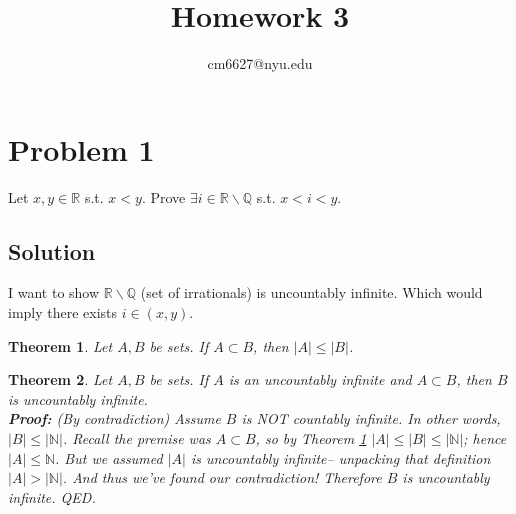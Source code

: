 \documentclass[12pt,fleqn]{article}
\title{Homework 3}
\author{cm6627@nyu.edu}
\date{}
\numberwithin{equation}{section} %
\newtheorem{theorem}{Theorem}
\begin{document}
\maketitle
\section*{Problem 1}
Let $x,y \in \mathbb R$ s.t. $x < y$. Prove  $\exists i \in \mathbb R \backslash \mathbb Q$ s.t. $x < i < y$.

\subsection*{Solution} I want to show $\mathbb R \backslash \mathbb Q$ (set of irrationals) is uncountably infinite. Which would imply there exists $i \in (x,y)$.

\begin{theorem}
	\label{thm:p1 subset inequality}
	Let $A,B$ be sets. If $A \subset B$, then $|A| \leq |B|$.
\end{theorem}
\begin{theorem}
	\label{thm:p1 subset uncountability}
Let $A,B$ be sets. If $A$ is an uncountably infinite and $A \subset B$, then $B$ is uncountably infinite.
\\
\textbf{Proof:} (By contradiction) Assume $B$ is NOT countably infinite. In other words, $|B| \leq |\mathbb N|$. Recall the premise was $A \subset B$, so by Theorem \ref{thm:p1 subset inequality} $|A| \leq |B| \leq |\mathbb N|$; hence $|A| \leq \mathbb N$. But we assumed $|A|$ is uncountably infinite-- unpacking that definition $|A| > |\mathbb N|$. And thus we've found our contradiction! Therefore $B$ is uncountably infinite. QED.
\end{theorem}
\end{document}

